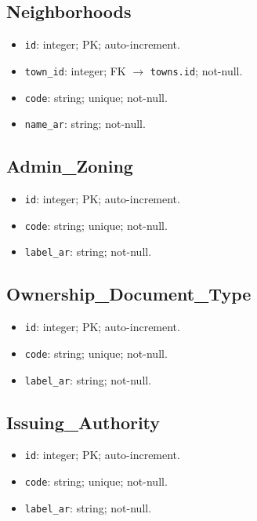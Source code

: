 \documentclass[12pt,oneside]{report}
\begin{document}
\subsection{Neighborhoods}
\begin{itemize}[leftmargin=*,itemsep=2pt]
  \item \texttt{id}: integer; PK; auto-increment.
  \item \texttt{town\_id}: integer; FK $\rightarrow$ \texttt{towns.id}; not-null.
  \item \texttt{code}: string; unique; not-null.
  \item \texttt{name\_ar}: string; not-null.
\end{itemize}

\subsection{Admin\_Zoning}
\begin{itemize}[leftmargin=*,itemsep=2pt]
  \item \texttt{id}: integer; PK; auto-increment.
  \item \texttt{code}: string; unique; not-null.
  \item \texttt{label\_ar}: string; not-null.
\end{itemize}

\subsection{Ownership\_Document\_Type}
\begin{itemize}[leftmargin=*,itemsep=2pt]
  \item \texttt{id}: integer; PK; auto-increment.
  \item \texttt{code}: string; unique; not-null.
  \item \texttt{label\_ar}: string; not-null.
\end{itemize}

\subsection{Issuing\_Authority}
\begin{itemize}[leftmargin=*,itemsep=2pt]
  \item \texttt{id}: integer; PK; auto-increment.
  \item \texttt{code}: string; unique; not-null.
  \item \texttt{label\_ar}: string; not-null.
\end{itemize}
\end{document}
